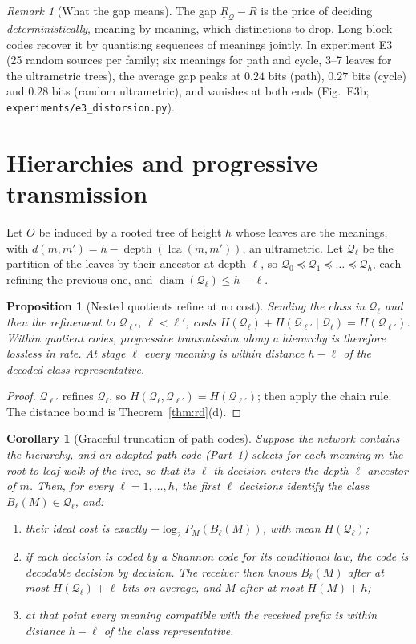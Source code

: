 \documentclass[11pt]{article}
\newtheorem{proposition}{Proposition}
\newtheorem{corollary}{Corollary}
\theoremstyle{definition}
\theoremstyle{remark}
\newtheorem{remark}{Remark}
\newcommand{\Q}{\mathcal{Q}}
\DeclareMathOperator{\diam}{diam}
\begin{document}
\begin{remark}[What the gap means]
The gap $\underline{R}_\Q-R$ is the price of deciding \emph{deterministically}, meaning by meaning, which distinctions to drop. Long block codes recover it by quantising sequences of meanings jointly. In experiment E3 (25 random sources per family; six meanings for path and cycle, 3--7 leaves for the ultrametric trees), the average gap peaks at $0.24$ bits (path), $0.27$ bits (cycle) and $0.28$ bits (random ultrametric), and vanishes at both ends (Fig.~E3b; \texttt{experiments/e3\_distorsion.py}).
\end{remark}

\section{Hierarchies and progressive transmission}

Let $O$ be induced by a rooted tree of height $h$ whose leaves are the meanings, with $d(m,m')=h-\operatorname{depth}(\operatorname{lca}(m,m'))$, an ultrametric. Let $\Q_\ell$ be the partition of the leaves by their ancestor at depth $\ell$, so $\Q_0\preceq\Q_1\preceq\dots\preceq\Q_h$, each refining the previous one, and $\diam(\Q_\ell)\le h-\ell$.

\begin{proposition}[Nested quotients refine at no cost]\label{prop:nested}
Sending the class in $\Q_{\ell}$ and then the refinement to $\Q_{\ell'}$, $\ell<\ell'$, costs $H(\Q_\ell)+H(\Q_{\ell'}\mid\Q_\ell)=H(\Q_{\ell'})$. Within quotient codes, progressive transmission along a hierarchy is therefore lossless in rate. At stage $\ell$ every meaning is within distance $h-\ell$ of the decoded class representative.
\end{proposition}

\begin{proof}
$\Q_{\ell'}$ refines $\Q_\ell$, so $H(\Q_\ell,\Q_{\ell'})=H(\Q_{\ell'})$; then apply the chain rule. The distance bound is Theorem~\ref{thm:rd}(d).
\end{proof}

\begin{corollary}[Graceful truncation of path codes]\label{cor:truncation}
Suppose the network contains the hierarchy, and an adapted path code (Part~1) selects for each meaning $m$ the root-to-leaf walk of the tree, so that its $\ell$-th decision enters the depth-$\ell$ ancestor of $m$. Then, for every $\ell=1,\dots,h$, the first $\ell$ decisions identify the class $B_\ell(M)\in\Q_\ell$, and:
\begin{enumerate}
\item[(a)] their ideal cost is exactly $-\log_2P_M(B_\ell(M))$, with mean $H(\Q_\ell)$;
\item[(b)] if each decision is coded by a Shannon code for its conditional law, the code is decodable decision by decision. The receiver then knows $B_\ell(M)$ after at most $H(\Q_\ell)+\ell$ bits on average, and $M$ after at most $H(M)+h$;
\item[(c)] at that point every meaning compatible with the received prefix is within distance $h-\ell$ of the class representative.
\end{enumerate}
\end{corollary}
\end{document}

